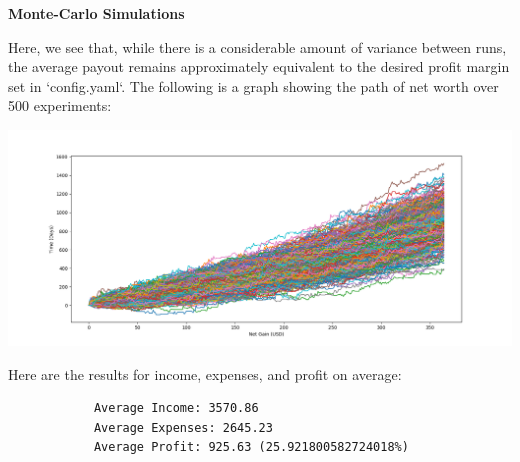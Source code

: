\documentclass[11pt]{article}
\begin{document}
\begin{enumerate}[A. ]
        \bigbreak

        \textbf{Monte-Carlo Simulations}

        Here, we see that, while there is a considerable amount of variance between runs, the average payout remains approximately equivalent to the desired profit margin set
        in `config.yaml`. The following is a graph showing the path of net worth over 500 experiments:

        \begin{center}
            \includegraphics[scale=0.45]{monte-carlo.png}
        \end{center}

        Here are the results for income, expenses, and profit on average:

        \begin{lstlisting}
            Average Income: 3570.86
            Average Expenses: 2645.23
            Average Profit: 925.63 (25.921800582724018%)
        \end{lstlisting}
\end{enumerate}
\end{document}
